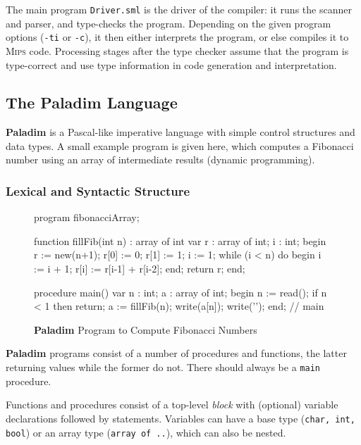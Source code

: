 \documentclass[12pt,a4paper]{article}
\newcommand{\paladim}{\textbf{Paladim}\xspace}
\newcommand{\mips}{\textsc{Mips}\xspace}
\begin{document}
The main program {\tt Driver.sml} is the driver of the compiler: it runs the
scanner and parser, and type-checks the program.
Depending on the given program options (\texttt{-ti} or
\texttt{-c}), it then either interprets the program, or else compiles
it to \mips code.
Processing stages after the type checker assume that the program is
type-correct and use type information in code generation and interpretation.

\subsection{The \paladim Language\label{sec:lang}}

\paladim is a Pascal-like imperative language with simple control structures
and data types.
A small example program is given here, which computes a Fibonacci number
using an array of intermediate results (dynamic programming).

\subsubsection{Lexical and Syntactic Structure}

\begin{figure}
\vspace*{-8ex}
\begin{code}[fontsize=\scriptsize, frame=lines,label=\textit{DATA/fibArray.pal}]
program fibonacciArray;

function fillFib(int n) : array of int
var r : array of int;
    i : int;
begin r    := new(n+1);
      r[0] := 0; r[1] := 1;
      i    := 1;
      while (i < n) do
         begin i  := i + 1;
               r[i] := r[i-1] + r[i-2];
         end;
      return r;
end;

procedure main()
var n : int;
    a : array of int;
begin n := read();
      if n < 1 then return;
      a := fillFib(n);
      write(a[n]); write('\n');
end; // main
\end{code}
\vspace*{-4ex}
\caption{\paladim Program to Compute Fibonacci Numbers}
\label{fig:fib}
\end{figure}

\paladim programs consist of a number of procedures and functions, the latter
returning values while the former do not. There should always be a \texttt{main}
procedure.

Functions and procedures consist of a top-level \emph{block} with
(optional) variable declarations followed by statements.
Variables can have a base type (\texttt{char, int, bool}) or an
array type (\texttt{array of ..}), which can also be nested.
\end{document}
